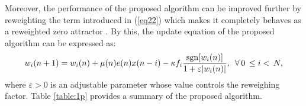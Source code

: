 \vspace{-0.5cm}
\par
\noindent Moreover, the performance of the proposed algorithm can be improved further by reweighting the term introduced in (\ref{eq22}) which makes it completely behaves as a reweighted zero attractor \cite{Hero}. By this, the update equation of the proposed algorithm can be expressed as:
\vspace{-0.1cm}
\begin{equation}
w_{i}(n+1)= w_{i}(n)+\mu(n)e(n)x(n-i)-\kappa f_{i}\frac{\mathrm{sgn}[w_{i}(n)]}{1+\varepsilon|w_{i}(n)|}, \hspace{5pt}\forall\hspace{2pt}0\hspace{2pt}\leq i<\hspace{2pt}N, \label{eq23}\vspace{-0.1cm}
\end{equation}
\noindent where $\varepsilon>0$ is an adjustable parameter whose value controls the reweighing factor. Table \ref{table:1p} provides a summary of the proposed algorithm.

\vspace{-0.3cm}
